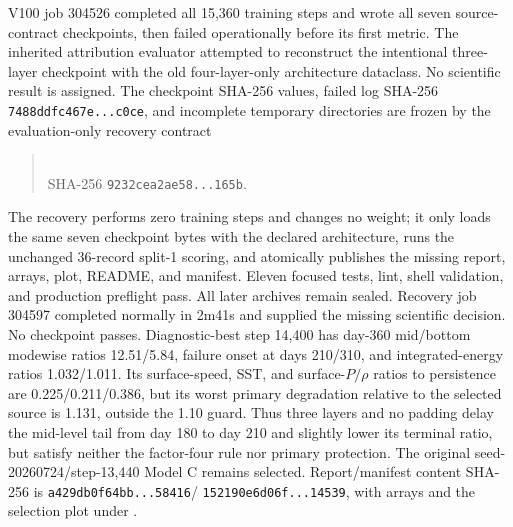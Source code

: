 \documentclass[11pt]{article}
\begin{document}
V100 job 304526 completed all 15,360 training steps and wrote all seven
source-contract checkpoints, then failed operationally before its first
metric.  The inherited attribution evaluator attempted to reconstruct the
intentional three-layer checkpoint with the old four-layer-only architecture
dataclass.  No scientific result is assigned.  The checkpoint SHA-256 values,
failed log SHA-256 \texttt{7488ddfc467e...c0ce}, and incomplete temporary
directories are frozen by the evaluation-only recovery contract
\begin{quote}
\\
SHA-256 \texttt{9232cea2ae58...165b}.
\end{quote}
The recovery performs zero training steps and changes no weight; it only
loads the same seven checkpoint bytes with the declared architecture, runs
the unchanged 36-record split-1 scoring, and atomically publishes the missing
report, arrays, plot, README, and manifest.  Eleven focused tests, lint, shell
validation, and production preflight pass.  All later archives remain sealed.
Recovery job 304597 completed normally in 2m41s and supplied the missing
scientific decision.  No checkpoint passes.  Diagnostic-best step 14,400
has day-360 mid/bottom modewise ratios 12.51/5.84, failure onset at days
210/310, and integrated-energy ratios 1.032/1.011.  Its surface-speed,
SST, and surface-\(P/\rho\) ratios to persistence are 0.225/0.211/0.386,
but its worst primary degradation relative to the selected source is 1.131,
outside the 1.10 guard.  Thus three layers and no padding delay the
mid-level tail from day 180 to day 210 and slightly lower its terminal ratio,
but satisfy neither the factor-four rule nor primary protection.  The
original seed-20260724/step-13,440 Model C remains selected.  Report/manifest
content SHA-256 is \texttt{a429db0f64bb...58416}/
\texttt{152190e6d06f...14539}, with arrays and the selection plot under
.
\end{document}
